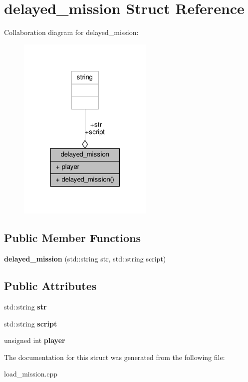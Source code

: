 \hypertarget{structdelayed__mission}{}\section{delayed\+\_\+mission Struct Reference}
\label{structdelayed__mission}


Collaboration diagram for delayed\+\_\+mission\+:
\nopagebreak
\begin{figure}[H]
\begin{center}
\leavevmode
\includegraphics[width=184pt]{d3/d8f/structdelayed__mission__coll__graph}
\end{center}
\end{figure}
\subsection*{Public Member Functions}
\begin{DoxyCompactItemize}
\item 
{\bfseries delayed\+\_\+mission} (std\+::string str, std\+::string script)\hypertarget{structdelayed__mission_a2074dae0448ad3a5ef04852e121d1406}{}\label{structdelayed__mission_a2074dae0448ad3a5ef04852e121d1406}

\end{DoxyCompactItemize}
\subsection*{Public Attributes}
\begin{DoxyCompactItemize}
\item 
std\+::string {\bfseries str}\hypertarget{structdelayed__mission_a3360caeadcb2c997c3fa3a3e0c0d2fe2}{}\label{structdelayed__mission_a3360caeadcb2c997c3fa3a3e0c0d2fe2}

\item 
std\+::string {\bfseries script}\hypertarget{structdelayed__mission_ab4c44dcfa0d3acb56972e6422047271e}{}\label{structdelayed__mission_ab4c44dcfa0d3acb56972e6422047271e}

\item 
unsigned int {\bfseries player}\hypertarget{structdelayed__mission_a721af940c2350a6dae3bb962a965df9e}{}\label{structdelayed__mission_a721af940c2350a6dae3bb962a965df9e}

\end{DoxyCompactItemize}


The documentation for this struct was generated from the following file\+:\begin{DoxyCompactItemize}
\item 
load\+\_\+mission.\+cpp\end{DoxyCompactItemize}
